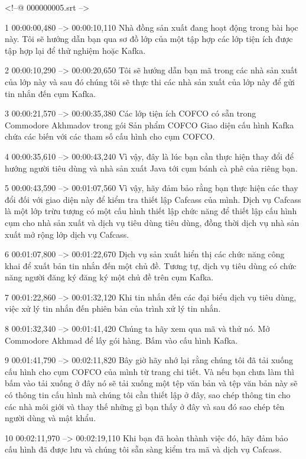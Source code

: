 <!--@ 000000005.srt -->

1
00:00:00,480 --> 00:00:10,110
Nhà đồng sản xuất đang hoạt động trong bài học này.  Tôi sẽ hướng dẫn bạn qua sơ đồ lớp của một tập hợp các lớp tiện ích được tập hợp lại để thử nghiệm hoặc Kafka.

2
00:00:10,290 --> 00:00:20,650
Tôi sẽ hướng dẫn bạn mã trong các nhà sản xuất của lớp này và sau đó chúng tôi sẽ thực thi các nhà sản xuất của lớp này để gửi tin nhắn đến cụm Kafka.

3
00:00:21,570 --> 00:00:35,380
Các lớp tiện ích COFCO có sẵn trong Commodore Akhmadov trong gói Sản phẩm COFCO Giao diện cấu hình Kafka chứa các biến với các tham số cấu hình cho cụm COFCO.

4
00:00:35,610 --> 00:00:43,240
Vì vậy, đây là lúc bạn cần thực hiện thay đổi để hướng người tiêu dùng và nhà sản xuất Java tới cụm bánh cà phê của riêng bạn.

5
00:00:43,590 --> 00:01:07,560
Vì vậy, hãy đảm bảo rằng bạn thực hiện các thay đổi đối với giao diện này để kiểm tra thiết lập Cafcass của mình.  Dịch vụ Cafcass là một lớp trừu tượng có một cấu hình thiết lập chức năng để thiết lập cấu hình cụm cho nhà sản xuất và dịch vụ tiêu dùng tiêu dùng, đồng thời dịch vụ nhà sản xuất mở rộng lớp dịch vụ Cafcass.

6
00:01:07,800 --> 00:01:22,670
Dịch vụ sản xuất hiển thị các chức năng công khai để xuất bản tin nhắn đến một chủ đề.  Tương tự, dịch vụ tiêu dùng có chức năng người đăng ký đăng ký một chủ đề trên cụm Kafka.

7
00:01:22,860 --> 00:01:32,120
Khi tin nhắn đến các đại biểu dịch vụ tiêu dùng, việc xử lý tin nhắn đến phiên bản của trình xử lý tin nhắn.

8
00:01:32,340 --> 00:01:41,420
Chúng ta hãy xem qua mã và thử nó.  Mở Commodore Akhmad để lấy gói hàng.  Bấm vào cấu hình Kafka.

9
00:01:41,790 --> 00:02:11,820
Bây giờ hãy nhớ lại rằng chúng tôi đã tải xuống cấu hình cho cụm COFCO của mình từ trang chi tiết.  Và nếu bạn chưa làm thì bấm vào tải xuống ở đây nó sẽ tải xuống một tệp văn bản và tệp văn bản này sẽ có thông tin cấu hình mà chúng tôi cần thiết lập ở đây, sao chép thông tin cho các nhà môi giới và thay thế những gì bạn thấy ở đây  và sau đó sao chép tên người dùng và mật khẩu.

10
00:02:11,970 --> 00:02:19,110
Khi bạn đã hoàn thành việc đó, hãy đảm bảo cấu hình đã được lưu và chúng tôi sẵn sàng kiểm tra mã và dịch vụ Cafcass.

